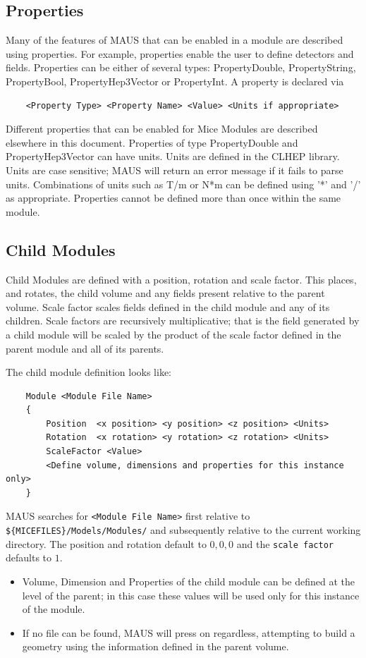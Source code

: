\subsection{Properties}
Many of the features of MAUS that can be enabled in a module are described using properties. For example, properties
enable the user to define detectors and fields. Properties can be either of several types: PropertyDouble,
PropertyString, PropertyBool, PropertyHep3Vector or PropertyInt. A property is declared via
\begin{verbatim}
    <Property Type> <Property Name> <Value> <Units if appropriate>
\end{verbatim}
Different properties that can be enabled for Mice Modules are described elsewhere in this document. Properties of type
PropertyDouble and PropertyHep3Vector can have units. Units are defined in the CLHEP library. Units are case sensitive;
MAUS will return an error message if it fails to parse units. Combinations of units such as T/m or N*m can be defined
using '*' and '/' as appropriate. Properties cannot be defined more than once within the same module.

\subsection{Child Modules}
Child Modules are defined with a position, rotation and scale factor. This places, and rotates, the child volume and any
fields present relative to the parent volume. Scale factor scales fields defined in the child module and any of its
children. Scale factors are recursively multiplicative; that is the field generated by a child module will be scaled by
the product of the scale factor defined in the parent module and all of its parents.

The child module definition looks like:
\begin{verbatim}
    Module <Module File Name>
    {
        Position  <x position> <y position> <z position> <Units>
        Rotation  <x rotation> <y rotation> <z rotation> <Units>
        ScaleFactor <Value>
        <Define volume, dimensions and properties for this instance only>
    }
\end{verbatim}
MAUS searches for \verb|<Module File Name>| first relative to \verb|${MICEFILES}/Models/Modules/| and subsequently
relative to the current working directory. The position and rotation default to $0, 0, 0$ and the \verb|scale factor| defaults
to $1$.

\liststyleLi
\begin{itemize}
\item Volume, Dimension and Properties of the child module can be defined at the level of the parent; in this case these
values will be used only for this instance of the module.
\end{itemize}
\liststyleLii
\begin{itemize}
\item If no file can be found, MAUS will press on regardless, attempting to build a geometry using the information
defined in the parent volume.
\end{itemize}
